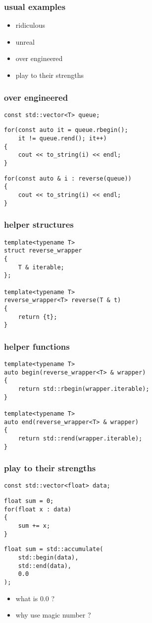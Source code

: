 \begin{frame}
    \frametitle{usual examples}
    \begin{itemize}
        \item ridiculous
        \item unreal
        \item over engineered
        \item play to their strengths
    \end{itemize}
\end{frame}

\begin{frame}[fragile]
    \frametitle{over engineered}
        \begin{verbatim}
const std::vector<T> queue;
    \end{verbatim}
    \begin{verbatim}
for(const auto it = queue.rbegin();
    it != queue.rend(); it++)
{
    cout << to_string(i) << endl;
}
    \end{verbatim}
    \begin{verbatim}
for(const auto & i : reverse(queue))
{
    cout << to_string(i) << endl;
}
    \end{verbatim}
\end{frame}

\begin{frame}[fragile]
    \frametitle{helper structures}
    \begin{verbatim}
template<typename T>
struct reverse_wrapper
{
    T & iterable;
};

template<typename T>
reverse_wrapper<T> reverse(T & t)
{
    return {t};
}
    \end{verbatim}
\end{frame}

\begin{frame}[fragile]
    \frametitle{helper functions}
    \begin{verbatim}
template<typename T>
auto begin(reverse_wrapper<T> & wrapper)
{
    return std::rbegin(wrapper.iterable);
}

template<typename T>
auto end(reverse_wrapper<T> & wrapper)
{
    return std::rend(wrapper.iterable);
}
    \end{verbatim}
\end{frame}

\begin{frame}[fragile]
    \frametitle{play to their strengths}
        \begin{verbatim}
const std::vector<float> data;
    \end{verbatim}
    \begin{verbatim}
float sum = 0;
for(float x : data)
{
    sum += x;
}
    \end{verbatim}
    \begin{verbatim}
float sum = std::accumulate(
    std::begin(data),
    std::end(data),
    0.0
);
    \end{verbatim}
    \begin{itemize}
        \item <2-> what is $0.0$ ?
        \item <3-> why use magic number ?
    \end{itemize}
\end{frame}

